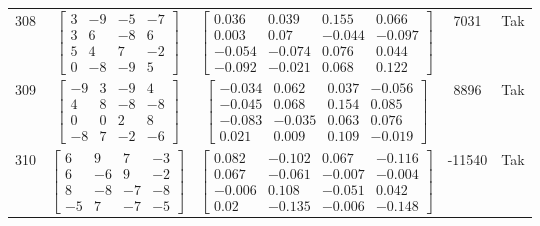\documentclass[a4paper,12pt]{article}
\begin{document}
\begin{tabular}{c c c c c}
308
&
$\begin{bmatrix} 3 & -9 & -5 & -7 \\ 3 & 6 & -8 & 6 \\ 5 & 4 & 7 & -2 \\ 0 & -8 & -9 & 5 \end{bmatrix}$
&
$\begin{bmatrix} 0.036 & 0.039 & 0.155 & 0.066 \\ 0.003 & 0.07 & -0.044 & -0.097 \\ -0.054 & -0.074 & 0.076 & 0.044 \\ -0.092 & -0.021 & 0.068 & 0.122 \end{bmatrix}$
&
7031
&
Tak
\\
309
&
$\begin{bmatrix} -9 & 3 & -9 & 4 \\ 4 & 8 & -8 & -8 \\ 0 & 0 & 2 & 8 \\ -8 & 7 & -2 & -6 \end{bmatrix}$
&
$\begin{bmatrix} -0.034 & 0.062 & 0.037 & -0.056 \\ -0.045 & 0.068 & 0.154 & 0.085 \\ -0.083 & -0.035 & 0.063 & 0.076 \\ 0.021 & 0.009 & 0.109 & -0.019 \end{bmatrix}$
&
8896
&
Tak
\\
310
&
$\begin{bmatrix} 6 & 9 & 7 & -3 \\ 6 & -6 & 9 & -2 \\ 8 & -8 & -7 & -8 \\ -5 & 7 & -7 & -5 \end{bmatrix}$
&
$\begin{bmatrix} 0.082 & -0.102 & 0.067 & -0.116 \\ 0.067 & -0.061 & -0.007 & -0.004 \\ -0.006 & 0.108 & -0.051 & 0.042 \\ 0.02 & -0.135 & -0.006 & -0.148 \end{bmatrix}$
&
-11540
&
Tak
\\
\end{tabular} \egroup \newpage
\end{document}
